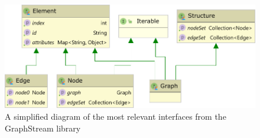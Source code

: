 \begin{figure}[h]
\includegraphics[width=0.8\linewidth]{graphstream_diagram.pdf}
\caption{A simplified diagram of the most relevant interfaces from the GraphStream library}
\label{fig:graphstream_diagram}
\end{figure}
